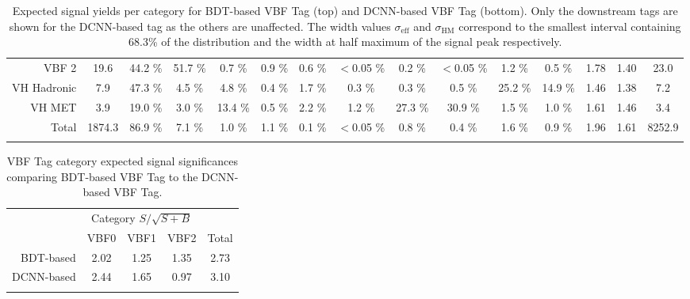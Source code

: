 \begin{landscape}
\begin{table}
{\begin{tabular}{rcccccccccccccc}
        \rowcolor{VBF2} VBF 2 &    19.6  &  44.2 \% &  51.7 \% &  0.7 \% &  0.9 \% &  0.6 \% &  $<$0.05 \% &  0.2 \% &  $<$0.05 \% &  1.2 \% &  0.5 \%& 1.78 & 1.40 & 23.0 \\
        \rowcolor{VHH} VH Hadronic &    7.9  &  47.3 \% &  4.5 \% &  4.8 \% &  0.4 \% &  1.7 \% &  0.3 \% &  0.3 \% &  0.5 \% &  25.2 \% &  14.9 \%& 1.46 & 1.38 & 7.2 \\
        \rowcolor{VHM} VH MET &    3.9  &  19.0 \% &  3.0 \% &  13.4 \% &  0.5 \% &  2.2 \% &  1.2 \% &  27.3 \% &  30.9 \% &  1.5 \% &  1.0 \%& 1.61 & 1.46 & 3.4 \\
        \rowcolor{Gray} Total &    1874.3  &  86.9 \% &  7.1 \% &  1.0 \% &  1.1 \% &  0.1 \% &  $<$0.05 \% &  0.8 \% &  0.4 \% &  1.6 \% &  0.9 \%& 1.96 & 1.61 & 8252.9 \\
        \thickhline
        \end{tabular}%
    }
        \caption{Expected signal yields per category for BDT-based VBF Tag (top) and DCNN-based VBF Tag (bottom). 
                 Only the downstream tags are shown for the DCNN-based tag as the others are unaffected.
                 The width values $\sigma_{\text{eff}}$ and $\sigma_{\text{HM}}$ correspond to the smallest interval 
                 containing 68.3\% of the \mgg distribution and the width at half maximum of the signal peak respectively.}
        \label{tab:stats_results:yield_table}
    \end{table}
\end{landscape}
\begin{table}[h!]
    \centering
    \renewcommand{\arraystretch}{1.3}
    \begin{tabular}{rcccc}
        \thickhline
        & \multicolumn{3}{c}{Category $S/\sqrt{S+B}$} & \\ 
        & VBF0 & VBF1 & VBF2 & Total \\
        \hline
        BDT-based  & 2.02 & 1.25 & 1.35 & 2.73\\
        DCNN-based & 2.44 & 1.65 & 0.97 & 3.10\\
        \thickhline
    \end{tabular}
    \caption{VBF Tag category expected signal significances comparing BDT-based VBF Tag to the DCNN-based VBF Tag.}
    \label{tab:stats_results:sig_table}
\end{table}



